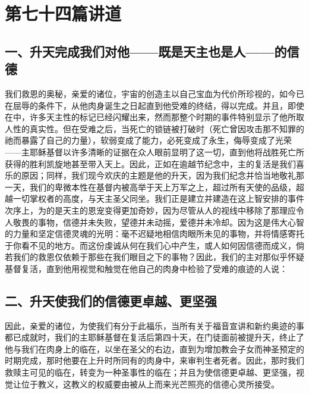 
\section{第七十四篇讲道}

\par


\subsection{一、升天完成我们对他——既是天主也是人——的信德}

我们救恩的奥秘，亲爱的诸位，宇宙的创造主以自己宝血为代价所珍视的，如今已在屈辱的条件下，从他肉身诞生之日起直到他受难的终结，得以完成。并且，即使在中，许多天主性的标记已经闪耀出来，然而那整个时期的事件特别显示了他所取人性的真实性。但在受难之后，当死亡的锁链被打破时（死亡曾因攻击那不知罪的祂而暴露了自己的力量），软弱变成了能力，必死变成了永生，侮辱变成了光荣——主耶稣基督以许多清晰的证据在众人眼前显明了这一切，直到他将战胜死亡所获得的胜利凯旋地甚至带入天上。因此，正如在逾越节纪念中，主的复活是我们喜乐的原因；同样，我们现今欢庆的主题是他的升天，因为我们纪念并恰当地敬礼那一天，我们的卑微本性在基督内被高举于天上万军之上，超过所有天使的品级，超越一切掌权者的高度，与天主圣父同坐。我们正是建立并建造在这上智安排的事件次序上，为的是天主的恩宠变得更加奇妙，因为尽管从人的视线中移除了那理应令人敬畏的事物，信德并未失败，望德并未动摇，爱德并未冷却。因为这是伟大心智的力量和坚定信德灵魂的光明：毫不迟疑地相信肉眼所未见的事物，并将情感寄托于你看不见的地方。而这份虔诚从何在我们心中产生，或人如何因信德而成义，倘若我们的救恩仅依赖于那些在我们眼目之下的事物？因此，我们的主对那似乎怀疑基督复活，直到他用视觉和触觉在他自己的肉身中检验了受难的痕迹的人说：\par


\subsection{二、升天使我们的信德更卓越、更坚强}

因此，亲爱的诸位，为使我们有分于此福乐，当所有关于福音宣讲和新约奥迹的事都已成就时，我们的主耶稣基督在复活后第四十天，在门徒面前被提升天，终止了他与我们在肉身上的临在，以坐在圣父的右边，直到为增加教会子女而神圣预定的时期完成，那时他要在上升时所同有的肉身中，来审判生者死者。因此，那时我们救赎主可见的临在，转变为一种圣事性的临在；并且为使信德更卓越、更坚强，视觉让位于教义，这教义的权威要由被从上而来光芒照亮的信德心灵所接受。\par

